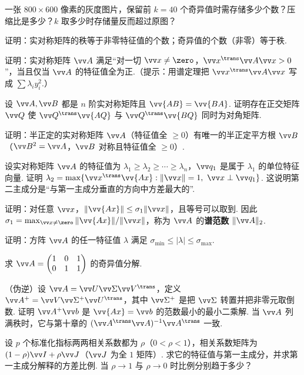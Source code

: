 {\begin{exA}
			\item\label{ex:dec:A19} 一张 $800\times600$ 像素的灰度图片，保留前 $k=40$ 个奇异值时需存储多少个数？压缩比是多少？$k$ 取多少时存储量反而超过原图？
			\item\label{ex:dec:A20} 证明：实对称矩阵的秩等于非零特征值的个数；奇异值的个数（非零）等于秩.
			\item\label{ex:dec:A21} 证明：实对称矩阵 $\vv A$ 满足“对一切 $\vv x\ne\zero$，$\vv x^\trans\vv A\vv x>0$”，当且仅当 $\vv A$ 的特征值全为正.（提示：用谱定理把 $\vv x^\trans\vv A\vv x$ 写成 $\sum\lambda_iy_i^2$.）
		\end{exA}
		
		\Bgroup
		\begin{exB}
			\item\label{ex:dec:B1} 设 $\vv A,\vv B$ 都是 $n$ 阶实对称矩阵且 $\vv{AB}=\vv{BA}$. 证明存在正交矩阵 $\vv Q$ 使 $\vv Q^\trans\vv{AQ}$ 与 $\vv Q^\trans\vv{BQ}$ 同时为对角矩阵.
			\item\label{ex:dec:B2} 证明：半正定的实对称矩阵 $\vv A$（特征值全 $\ge0$）有唯一的半正定平方根 $\vv B$（$\vv B^2=\vv A$，$\vv B$ 对称且特征值全 $\ge0$）.
			\item\label{ex:dec:B3} 设实对称矩阵 $\vv A$ 的特征值为 $\lambda_1\ge\lambda_2\ge\cdots\ge\lambda_n$，$\vv q_1$ 是属于 $\lambda_1$ 的单位特征向量. 证明 $\lambda_2=\max\{\vv x^\trans\vv{Ax}:\|\vv x\|=1,\ \vv x\perp\vv q_1\}$. 这说明第二主成分是“与第一主成分垂直的方向中方差最大的”.
			\item\label{ex:dec:B4} 证明：对任意 $\vv x$，$\|\vv{Ax}\|\le\sigma_1\|\vv x\|$，且等号可以取到. 因此 $\sigma_1=\max_{\vv x\ne\zero}\|\vv{Ax}\|/\|\vv x\|$，称为 $\vv A$ 的\textbf{谱范数} $\|\vv A\|_2$.
			\item\label{ex:dec:B5} 证明：方阵 $\vv A$ 的任一特征值 $\lambda$ 满足 $\sigma_{\min}\le|\lambda|\le\sigma_{\max}$.
			\item\label{ex:dec:B6} 求 $\vv A=\begin{pmatrix}1&0&1\\0&1&1\end{pmatrix}$ 的奇异值分解.
			\item\label{ex:dec:B7} （伪逆）设 $\vv A=\vv U\vv\Sigma\vv V^\trans$，定义 $\vv A^+=\vv V\vv\Sigma^+\vv U^\trans$，其中 $\vv\Sigma^+$ 是把 $\vv\Sigma$ 转置并把非零元取倒数. 证明 $\vv A^+\vv b$ 是 $\vv{Ax}=\vv b$ 的范数最小的最小二乘解. 当 $\vv A$ 列满秩时，它与第十章的 $(\vv A^\trans\vv A)^{-1}\vv A^\trans$ 一致.
			\item\label{ex:dec:B8} 设 $p$ 个标准化指标两两相关系数都为 $\rho$（$0<\rho<1$），相关系数矩阵为 $(1-\rho)\vv I+\rho\vv J$（$\vv J$ 为全 $1$ 矩阵）. 求它的特征值与第一主成分，并求第一主成分解释的方差比例. 当 $\rho\to1$ 与 $\rho\to0$ 时比例分别趋于多少？

\end{exB}}
